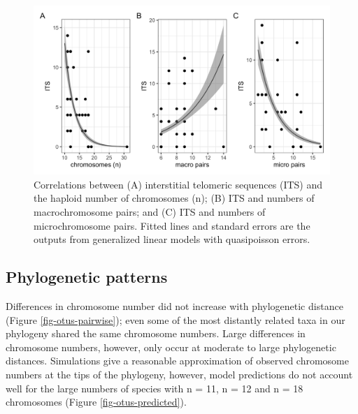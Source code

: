 \documentclass[a4paper, 12pt]{article}
\begin{document}
\newpage
\begin{figure}[H]
 \centering
  \includegraphics[width = \linewidth]{figures/ITS-chromosomes.png}
  \caption{Correlations between (A) interstitial telomeric sequences (ITS) and the haploid number of chromosomes (n); (B) ITS and numbers of macrochromosome pairs; and (C) ITS and numbers of microchromosome pairs. Fitted lines and standard errors are the outputs from generalized linear models with quasipoisson errors.
}
  \label{fig-otus-its}
\end{figure} 


\subsection{Phylogenetic patterns}
Differences in chromosome number did not increase with phylogenetic distance (Figure \ref{fig-otus-pairwise}); even some of the most distantly related taxa in our phylogeny shared the same chromosome numbers. Large differences in chromosome numbers, however, only occur at moderate to large phylogenetic distances. Simulations give a reasonable approximation of observed chromosome numbers at the tips of the phylogeny, however, model predictions do not account well for the large numbers of species with n = 11, n = 12 and n = 18 chromosomes (Figure \ref{fig-otus-predicted}). 
\end{document}
